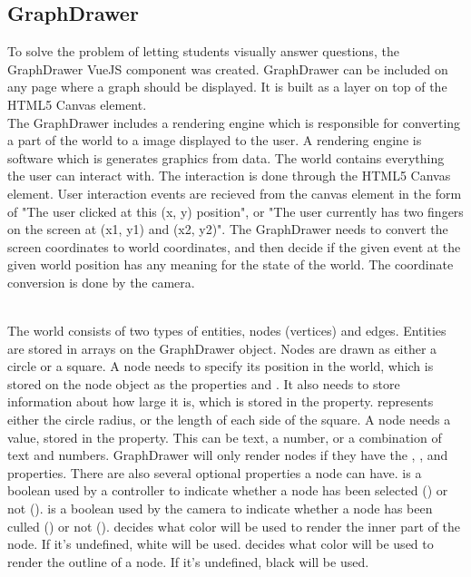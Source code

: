 \subsection{GraphDrawer}
To solve the problem of letting students visually answer questions, the GraphDrawer VueJS component was created. GraphDrawer can be included on any page where a graph should be displayed. It is built as a layer on top of the HTML5 Canvas element.
\\[11pt]
The GraphDrawer includes a rendering engine which is responsible for converting a part of the world to a image displayed to the user. A rendering engine is software which is generates graphics from data. The world contains everything the user can interact with. The interaction is done through the HTML5 Canvas element. User interaction events are recieved from the canvas element in the form of "The user clicked at this (x, y) position", or "The user currently has two fingers on the screen at (x1, y1) and (x2, y2)". The GraphDrawer needs to convert the screen coordinates to world coordinates, and then decide if the given event at the given world position has any meaning for the state of the world. The coordinate conversion is done by the camera.

\\[11pt]
The world consists of two types of entities, nodes (vertices) and edges. Entities are stored in arrays on the GraphDrawer object. Nodes are drawn as either a circle or a square. A node needs to specify its position in the world, which is stored on the node object as the properties  and . It also needs to store information about how large it is, which is stored in the  property.  represents either the circle radius, or the length of each side of the square. A node needs a value, stored in the  property. This can be text, a number, or a combination of text and numbers. GraphDrawer will only render nodes if they have the , ,  and  properties. There are also several optional properties a node can have.  is a boolean used by a controller to indicate whether a node has been selected () or not ().  is a boolean used by the camera to indicate whether a node has been culled () or not ().  decides what color will be used to render the inner part of the node. If it's undefined, white will be used.  decides  what color will be used to render the outline of a node. If it's undefined, black will be used.
